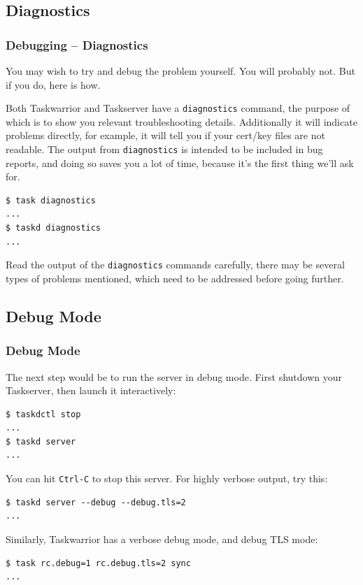 \documentclass[t,handout]{beamer}
\begin{document}
\subsection{Diagnostics}

\begin{frame}[fragile]\frametitle{Debugging -- Diagnostics}
    \vfill
    You may wish to try and debug the problem yourself. You will probably not. But if you do, here is how.

    Both Taskwarrior and Taskserver have a \verb+diagnostics+ command, the purpose of which is to show you relevant troubleshooting details. Additionally it will indicate problems directly, for example, it will tell you if your cert/key files are not readable. The output from \verb+diagnostics+ is intended to be included in bug reports, and doing so saves you a lot of time, because it's the first thing we'll ask for.

    \begin{lstlisting}
$ task diagnostics
...
$ taskd diagnostics
...\end{lstlisting}

    Read the output of the \verb+diagnostics+ commands carefully, there may be several types of problems mentioned, which need to be addressed before going further.
\end{frame}

\subsection{Debug Mode}

\begin{frame}[fragile]\frametitle{Debug Mode}
    \vfill
    The next step would be to run the server in debug mode. First shutdown your Taskserver, then launch it interactively:

    \begin{lstlisting}
$ taskdctl stop
...
$ taskd server
...\end{lstlisting}

    You can hit \verb+Ctrl-C+ to stop this server. For highly verbose output, try this:
    \begin{lstlisting}
$ taskd server --debug --debug.tls=2
...\end{lstlisting}

    Similarly, Taskwarrior has a verbose debug mode, and debug TLS mode:
    \begin{lstlisting}
$ task rc.debug=1 rc.debug.tls=2 sync
...\end{lstlisting}
\end{frame}
\end{document}
